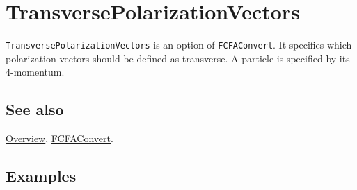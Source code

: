 \documentclass[../FeynCalcManual.tex]{subfiles}
\begin{document}
\hypertarget{transversepolarizationvectors}{
\section{TransversePolarizationVectors}\label{transversepolarizationvectors}}

\texttt{TransversePolarizationVectors} is an option of
\texttt{FCFAConvert}. It specifies which polarization vectors should be
defined as transverse. A particle is specified by its 4-momentum.

\subsection{See also}

\hyperlink{toc}{Overview}, \hyperlink{fcfaconvert}{FCFAConvert}.

\subsection{Examples}
\end{document}
